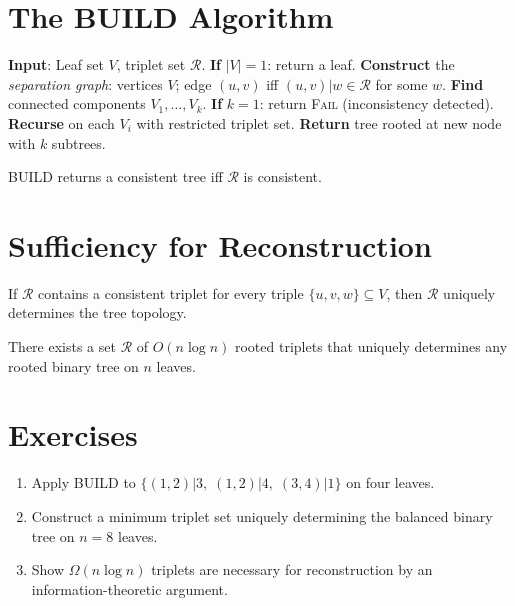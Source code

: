 \section{The BUILD Algorithm}

\begin{algorithm}
\label{alg:build}
\textbf{Input}: Leaf set $V$, triplet set $\mathcal{R}$.
\textbf{If} $|V|=1$: return a leaf.
\textbf{Construct} the \emph{separation graph}: vertices $V$; edge $(u,v)$ iff $(u,v)|w \in \mathcal{R}$ for some $w$.
\textbf{Find} connected components $V_1,\ldots,V_k$.
\textbf{If} $k=1$: return \textsc{Fail} (inconsistency detected).
\textbf{Recurse} on each $V_i$ with restricted triplet set.
\textbf{Return} tree rooted at new node with $k$ subtrees.
\end{algorithm}

\begin{theorem}
BUILD returns a consistent tree iff $\mathcal{R}$ is consistent.
\end{theorem}

\section{Sufficiency for Reconstruction}

\begin{theorem}
\label{thm:dense_triplets}
If $\mathcal{R}$ contains a consistent triplet for every triple $\{u,v,w\}\subseteq V$, then $\mathcal{R}$ uniquely determines the tree topology.
\end{theorem}

\begin{theorem}
\label{thm:sparse_reconstruction}
There exists a set $\mathcal{R}$ of $O(n\log n)$ rooted triplets that uniquely determines any rooted binary tree on $n$ leaves.
\end{theorem}

\section{Exercises}

\begin{enumerate}
  \item Apply BUILD to $\{(1,2)|3,\;(1,2)|4,\;(3,4)|1\}$ on four leaves.
  \item Construct a minimum triplet set uniquely determining the balanced binary tree on $n=8$ leaves.
  \item Show $\Omega(n\log n)$ triplets are necessary for reconstruction by an information-theoretic argument.
\end{enumerate}

